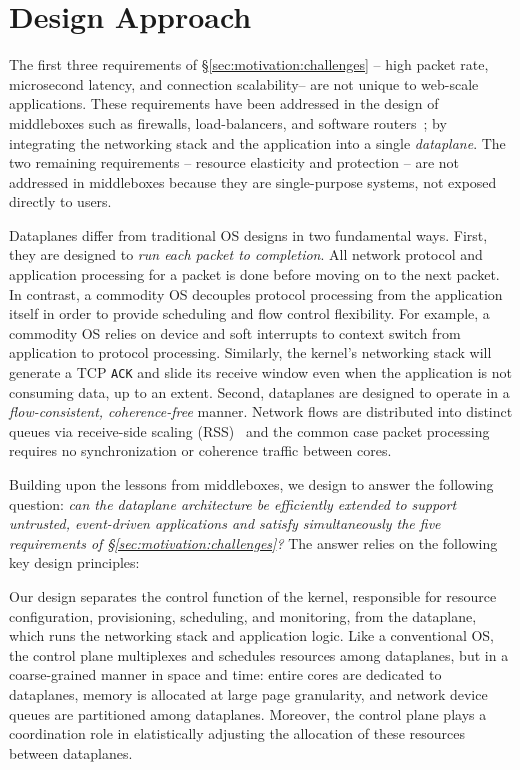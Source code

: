 \section{\ix Design Approach}
\label{sec:design}

The first three requirements of \S\ref{sec:motivation:challenges} --
high packet rate, microsecond latency, and connection scalability--
are not unique to web-scale applications.  These requirements have
been addressed in the design of middleboxes such as firewalls,
load-balancers, and software
routers~\cite{routebricks,click};
by integrating the networking stack and the application into a single
\emph{dataplane}. The two remaining requirements -- resource
elasticity and protection -- are not addressed in middleboxes because
they are single-purpose systems, not exposed directly to users.

Dataplanes differ from traditional OS designs in two fundamental
ways. First, they are designed to \emph{run each packet to
  completion}. All network protocol and application processing for a
packet is done before moving on to the next packet.  In contrast, a
commodity OS decouples protocol processing from the application itself
in order to provide scheduling and flow control flexibility.  For
example, a commodity OS relies on device and soft interrupts to
context switch from application to protocol processing. Similarly, the
kernel's networking stack will generate a TCP \texttt{ACK} and slide
its receive window even when the application is not consuming data, up
to an extent. Second, dataplanes are designed to operate in a
\emph{flow-consistent, coherence-free} manner.  Network flows are
distributed into distinct queues via receive-side scaling
(RSS)~\cite{url:rss} and the common case packet processing requires no
synchronization or coherence traffic between cores.

Building upon the lessons from middleboxes, we design \ix to answer
the following question: {\it {} can the dataplane architecture be
  efficiently extended to support untrusted, event-driven applications
  and satisfy simultaneously the five requirements of
  \S\ref{sec:motivation:challenges}?}  The answer relies on the
following key design principles:


Our design separates the control function of the kernel, responsible
for resource configuration, provisioning, scheduling, and monitoring,
from the dataplane, which runs the networking stack and application
logic.  Like a conventional OS, the control plane multiplexes and
schedules resources among dataplanes, but in a coarse-grained manner
in space and time: entire cores are dedicated to dataplanes,
memory is allocated at large page granularity, and
network device queues are partitioned among dataplanes.
Moreover, the control plane plays a coordination role in elatistically
adjusting the allocation of these resources between dataplanes.

